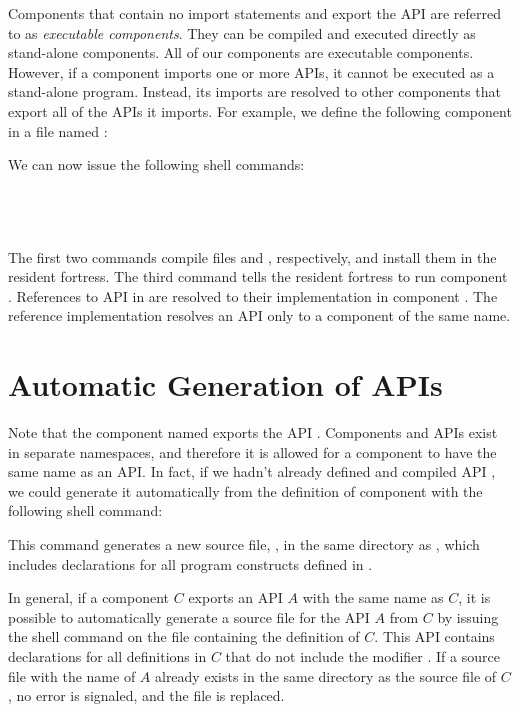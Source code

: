 Components that contain no import statements and export the API
 are referred to as \emph{executable components}. They
can be compiled and executed directly as stand-alone components. All
of our  components are executable components.
However,
if a component imports one or more APIs, it cannot be executed as a
stand-alone program. Instead, its imports are resolved to
other components that export all of the APIs it imports.
For example, we define
the following component in a file named :



We can now issue the following shell commands:

 \\
 \\
 \\

The first two commands compile files  and
,
respectively, and install them in the resident fortress. The third
command tells the resident fortress to run component .
References to API  in  are resolved to their
implementation in component .
The reference implementation resolves an API only to a component of the same
name.

\section{Automatic Generation of APIs}

Note that the component named  exports the API
. Components and APIs exist in separate namespaces, and therefore
it is allowed for a component to have the same name as an API.
In fact, if we hadn't already defined and compiled API ,
we could generate it automatically
from the definition of component 
with the following shell command:


This command generates a new source file, , in the
same directory as , which includes declarations for
all program constructs defined in .

In general, if a component $C$ exports an API $A$ with the same name as $C$,
it is possible to automatically generate a source file
for the API $A$ from $C$
by issuing the shell command  on the file
containing the definition of $C$.
This API contains declarations for all definitions in $C$ that do not include
the modifier .
If a source file with the name of $A$ already exists in the
same directory as the source file of $C$, no error is signaled,
and the file is replaced.


